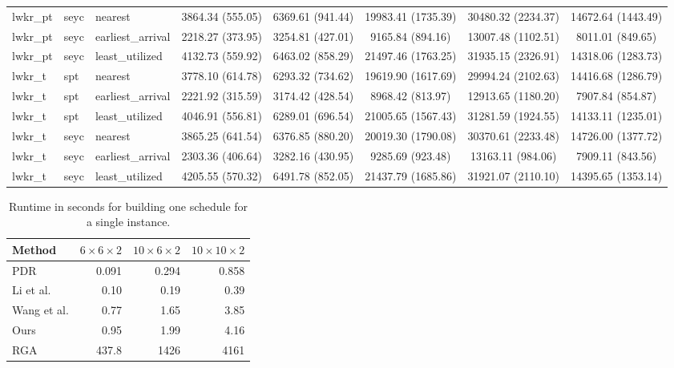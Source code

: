 \begin{table}[t]
\begin{tabular}{lllccccc}
lwkr\_pt & seyc & nearest & 3864.34 (555.05) & 6369.61 (941.44) & 19983.41 (1735.39) & 30480.32 (2234.37) & 14672.64 (1443.49) \\
lwkr\_pt & seyc & earliest\_arrival & 2218.27 (373.95) & 3254.81 (427.01) & 9165.84 (894.16) & 13007.48 (1102.51) & 8011.01 (849.65) \\
lwkr\_pt & seyc & least\_utilized & 4132.73 (559.92) & 6463.02 (858.29) & 21497.46 (1763.25) & 31935.15 (2326.91) & 14318.06 (1283.73) \\
lwkr\_t & spt & nearest & 3778.10 (614.78) & 6293.32 (734.62) & 19619.90 (1617.69) & 29994.24 (2102.63) & 14416.68 (1286.79) \\
lwkr\_t & spt & earliest\_arrival & 2221.92 (315.59) & 3174.42 (428.54) & 8968.42 (813.97) & 12913.65 (1180.20) & 7907.84 (854.87) \\
lwkr\_t & spt & least\_utilized & 4046.91 (556.81) & 6289.01 (696.54) & 21005.65 (1567.43) & 31281.59 (1924.55) & 14133.11 (1235.01) \\
lwkr\_t & seyc & nearest & 3865.25 (641.54) & 6376.85 (880.20) & 20019.30 (1790.08) & 30370.61 (2233.48) & 14726.00 (1377.72) \\
lwkr\_t & seyc & earliest\_arrival & 2303.36 (406.64) & 3282.16 (430.95) & 9285.69 (923.48) & 13163.11 (984.06) & 7909.11 (843.56) \\
lwkr\_t & seyc & least\_utilized & 4205.55 (570.32) & 6491.78 (852.05) & 21437.79 (1685.86) & 31921.07 (2110.10) & 14395.65 (1353.14) \\
\bottomrule
\end{tabular}
\end{table}

\begin{table}[t]
\centering
\caption{Runtime in seconds for building one schedule for a single instance.}
\label{tab:time}
\begin{tabular}{lrrr}
\toprule
Method & $6\times6\times2$ & $10\times6\times2$ & $10\times10\times2$ \\
\midrule
PDR & 0.091 & 0.294 & 0.858 \\
Li et al. & 0.10 & 0.19 & 0.39 \\
Wang et al. & 0.77 & 1.65 & 3.85 \\
Ours & 0.95 & 1.99 & 4.16 \\
RGA & 437.8 & 1426 & 4161 \\
\bottomrule
\end{tabular}
\end{table}

